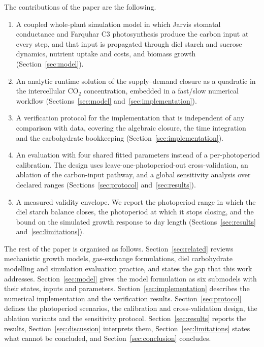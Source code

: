 The contributions of the paper are the following.
\begin{enumerate}
\item A coupled whole-plant simulation model in which Jarvis stomatal
  conductance and Farquhar C3 photosynthesis produce the carbon input at every
  step, and that input is propagated through diel starch and sucrose dynamics,
  nutrient uptake and costs, and biomass growth (Section~\ref{sec:model}).
\item An analytic runtime solution of the supply--demand closure as a quadratic
  in the intercellular CO$_2$ concentration, embedded in a fast/slow numerical
  workflow (Sections~\ref{sec:model} and~\ref{sec:implementation}).
\item A verification protocol for the implementation that is independent of any
  comparison with data, covering the algebraic closure, the time integration
  and the carbohydrate bookkeeping (Section~\ref{sec:implementation}).
\item An evaluation with four shared fitted parameters instead of a
  per-photoperiod calibration. The design uses leave-one-photoperiod-out
  cross-validation, an ablation of the carbon-input pathway, and a global
  sensitivity analysis over declared ranges
  (Sections~\ref{sec:protocol} and~\ref{sec:results}).
\item A measured validity envelope. We report the photoperiod range in which
  the diel starch balance closes, the photoperiod at which it stops closing,
  and the bound on the simulated growth response to day length
  (Sections~\ref{sec:results} and~\ref{sec:limitations}).
\end{enumerate}

The rest of the paper is organised as follows.
Section~\ref{sec:related} reviews mechanistic growth models, gas-exchange
formulations, diel carbohydrate modelling and simulation evaluation practice,
and states the gap that this work addresses. Section~\ref{sec:model} gives the
model formulation as six submodels with their states, inputs and parameters.
Section~\ref{sec:implementation} describes the numerical implementation and the
verification results. Section~\ref{sec:protocol} defines the photoperiod
scenarios, the calibration and cross-validation design, the ablation variants
and the sensitivity protocol. Section~\ref{sec:results} reports the results,
Section~\ref{sec:discussion} interprets them, Section~\ref{sec:limitations}
states what cannot be concluded, and Section~\ref{sec:conclusion} concludes.

